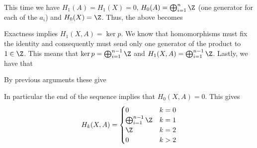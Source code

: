 \documentclass{article}
\begin{document}
\begin{solution}{\parindent}
\begin{enumerate}[(a)]
\begin{center}
    \end{center}
    This time we have $H_1(A) = H_1(X) = 0$, $H_0(A) =
    \bigoplus_{i=1}^{n} \Z$ (one generator for each of the $a_i$) and
    $H_0(X) = \Z$. Thus, the above becomes
    \begin{center}
    \end{center}
    Exactness implies $H_1(X,A) = \ker p$. We know that homomorphisms
    must fix the identity and consequently must send only one
    generator of the product to $1 \in \Z$. This means that $\ker p =
    \bigoplus_{i=1}^{n-1} \Z$ and $H_1(X,A) = \bigoplus_{i=1}^{n-1}
    \Z$. Lastly, we have that
    \begin{center}
    \end{center}
    By previous arguments these give
    \begin{center}
    \end{center}
    In particular the end of the sequence implies that $H_0(X,A) =
    0$. This gives
    \[
    H_k(X,A) =
    \begin{cases}
      0 & k = 0 \\
      \bigoplus_{i=1}^{n-1} \Z & k = 1 \\
      \Z & k = 2 \\
      0 & k > 2
    \end{cases}
    \]


\end{enumerate}
\end{solution}
\end{document}
